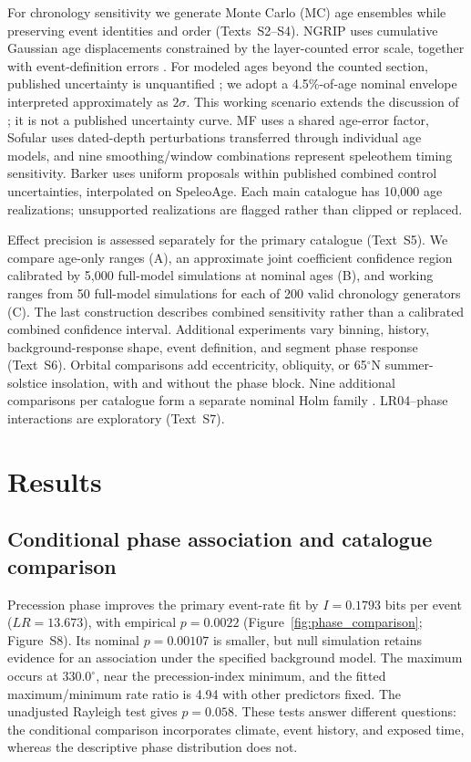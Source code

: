 \documentclass[11pt]{article}
\begin{document}
For chronology sensitivity we generate Monte Carlo (MC) age ensembles while preserving event identities and order (Texts~S2--S4). NGRIP uses cumulative Gaussian age displacements constrained by the layer-counted error scale, together with event-definition errors \citep{rasmussen2022gicc05,svensson2008sixty}. For modeled ages beyond the counted section, published uncertainty is unquantified \citep{corrick2020synchronous}; we adopt a 4.5\%-of-age nominal envelope interpreted approximately as $2\sigma$. This working scenario extends the discussion of \citet{moseley2020nalps19}; it is not a published uncertainty curve. MF uses a shared age-error factor, Sofular uses dated-depth perturbations transferred through individual age models, and nine smoothing/window combinations represent speleothem timing sensitivity. Barker uses uniform proposals within published combined control uncertainties, interpolated on SpeleoAge. Each main catalogue has 10,000 age realizations; unsupported realizations are flagged rather than clipped or replaced.

Effect precision is assessed separately for the primary catalogue (Text~S5). We compare age-only ranges (A), an approximate joint coefficient confidence region calibrated by 5,000 full-model simulations at nominal ages (B), and working ranges from 50 full-model simulations for each of 200 valid chronology generators (C). The last construction describes combined sensitivity rather than a calibrated combined confidence interval. Additional experiments vary binning, history, background-response shape, event definition, and segment phase response (Text~S6). Orbital comparisons add eccentricity, obliquity, or 65$^\circ$N summer-solstice insolation, with and without the phase block. Nine additional comparisons per catalogue form a separate nominal Holm family \citep{holm1979simple}. LR04--phase interactions are exploratory (Text~S7).

\section{Results}
\subsection{Conditional phase association and catalogue comparison}
Precession phase improves the primary event-rate fit by $I=0.1793$ bits per event ($LR=13.673$), with empirical $p=0.0022$ (Figure~\ref{fig:phase_comparison}; Figure~S8). Its nominal $p=0.00107$ is smaller, but null simulation retains evidence for an association under the specified background model. The maximum occurs at $330.0^\circ$, near the precession-index minimum, and the fitted maximum/minimum rate ratio is 4.94 with other predictors fixed. The unadjusted Rayleigh test gives $p=0.058$. These tests answer different questions: the conditional comparison incorporates climate, event history, and exposed time, whereas the descriptive phase distribution does not.
\end{document}
